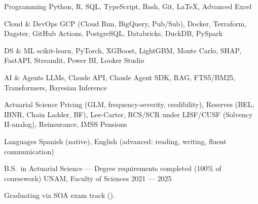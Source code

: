 \documentclass[10pt, letterpaper]{awesome-cv}
\begin{document}

\begin{cvskills}
  \cvskill
    {Programming}
    {Python, R, SQL, TypeScript, Bash, Git, \LaTeX, Advanced Excel}

  \cvskill
    {Cloud \& DevOps}
    {GCP (Cloud Run, BigQuery, Pub/Sub), Docker, Terraform, Dagster, GitHub Actions, PostgreSQL, Databricks, DuckDB, PySpark}

  \cvskill
    {DS \& ML}
    {scikit-learn, PyTorch, XGBoost, LightGBM, Monte Carlo, SHAP, FastAPI, Streamlit, Power BI, Looker Studio}

  \cvskill
    {AI \& Agents}
    {LLMs, Claude API, Claude Agent SDK, RAG, FTS5/BM25, Transformers, Bayesian Inference}

  \cvskill
    {Actuarial Science}
    {Pricing (GLM, frequency-severity, credibility), Reserves (BEL, IBNR, Chain Ladder, BF), Lee-Carter, RCS/SCR under LISF/CUSF (Solvency II-analog), Reinsurance, IMSS Pensions}

  \cvskill
    {Languages}
    {Spanish (native), English (advanced: reading, writing, fluent communication)}
\end{cvskills}


\begin{cventries}
  \cventry
    {B.S.\ in Actuarial Science — Degree requirements completed (100\% of coursework)}
    {UNAM, Faculty of Sciences}
    {}
    {2021 — 2025}
    {
      \begin{cvitems}
        \item {Graduating via SOA exam track ().}
      \end{cvitems}
    }
\end{cventries}

\end{document}
